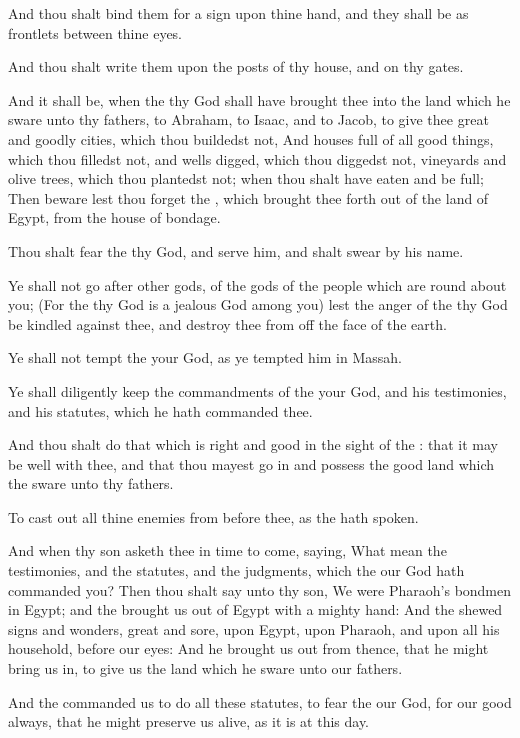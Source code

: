 \Verse And thou shalt bind them for a sign upon thine hand, and they shall be as frontlets between thine eyes.

\Verse And thou shalt write them upon the posts of thy house, and on thy gates.

\Verse And it shall be, when the \LORD thy God shall have brought thee into the land which he sware unto thy fathers, to Abraham, to Isaac, and to Jacob, to give thee great and goodly cities, which thou buildedst not, \Verse And houses full of all good things, which thou filledst not, and wells digged, which thou diggedst not, vineyards and olive trees, which thou plantedst not; when thou shalt have eaten and be full; \Verse Then beware lest thou forget the \LORD, which brought thee forth out of the land of Egypt, from the house of bondage.

\Verse Thou shalt fear the \LORD thy God, and serve him, and shalt swear by his name.

\Verse Ye shall not go after other gods, of the gods of the people which are round about you; \Verse (For the \LORD thy God is a jealous God among you) lest the anger of the \LORD thy God be kindled against thee, and destroy thee from off the face of the earth.

\Verse Ye shall not tempt the \LORD your God, as ye tempted him in Massah.

\Verse Ye shall diligently keep the commandments of the \LORD your God, and his testimonies, and his statutes, which he hath commanded thee.

\Verse And thou shalt do that which is right and good in the sight of the \LORD: that it may be well with thee, and that thou mayest go in and possess the good land which the \LORD sware unto thy fathers.

\Verse To cast out all thine enemies from before thee, as the \LORD hath spoken.

\Verse And when thy son asketh thee in time to come, saying, What mean the testimonies, and the statutes, and the judgments, which the \LORD our God hath commanded you?  \Verse Then thou shalt say unto thy son, We were Pharaoh's bondmen in Egypt; and the \LORD brought us out of Egypt with a mighty hand: \Verse And the \LORD shewed signs and wonders, great and sore, upon Egypt, upon Pharaoh, and upon all his household, before our eyes: \Verse And he brought us out from thence, that he might bring us in, to give us the land which he sware unto our fathers.

\Verse And the \LORD commanded us to do all these statutes, to fear the \LORD our God, for our good always, that he might preserve us alive, as it is at this day.

